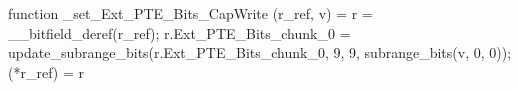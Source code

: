 function _set_Ext_PTE_Bits_CapWrite (r_ref, v) = {
    r = __bitfield_deref(r_ref);
    r.Ext_PTE_Bits_chunk_0 = update_subrange_bits(r.Ext_PTE_Bits_chunk_0, 9, 9, subrange_bits(v, 0, 0));
    (*r_ref) = r
}

